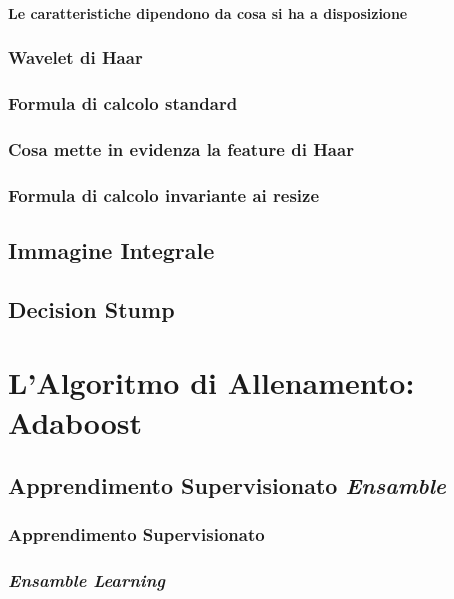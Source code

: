             \subsubsection{Le caratteristiche dipendono da cosa si ha a disposizione}
        \subsection{Wavelet di Haar}
            \subsubsection{}
        \subsection{Formula di calcolo standard}
        \subsection{Cosa mette in evidenza la feature di Haar}
        \subsection{Formula di calcolo invariante ai resize}
    \section{Immagine Integrale}
    \label{sec:integral_image}
    \section{Decision Stump}
    \label{sec:decision_stump}

\chapter{L'Algoritmo di Allenamento: Adaboost}
\label{chap:adaboost}
    \section{Apprendimento Supervisionato \emph{Ensamble}}
    \label{sec:supervised_ensamble_learning}
        \subsection{Apprendimento Supervisionato}
        \label{sub:supervised_learning}
        \subsection{\emph{Ensamble Learning}}
        \label{sub:ensamble_learning}
